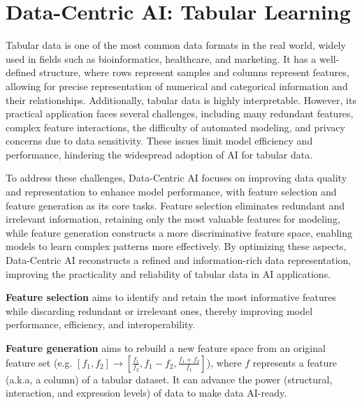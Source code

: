\vspace{-0.2cm}
\section{Data-Centric AI: Tabular Learning}

Tabular data is one of the most common data formats in the real world, widely used in fields such as bioinformatics, healthcare, and marketing. It has a well-defined structure, where rows represent samples and columns represent features, allowing for precise representation of numerical and categorical information and their relationships. Additionally, tabular data is highly interpretable. However, its practical application faces several challenges, including many redundant features, complex feature interactions, the difficulty of automated modeling, and privacy concerns due to data sensitivity. These issues limit model efficiency and performance, hindering the widespread adoption of AI for tabular data.

To address these challenges, Data-Centric AI focuses on improving data quality and representation to enhance model performance, with feature selection and feature generation as its core tasks. Feature selection eliminates redundant and irrelevant information, retaining only the most valuable features for modeling, while feature generation constructs a more discriminative feature space, enabling models to learn complex patterns more effectively. By optimizing these aspects, Data-Centric AI reconstructs a refined and information-rich data representation, improving the practicality and reliability of tabular data in AI applications.

\textbf{Feature selection}  aims to identify and retain the most informative features while discarding redundant or irrelevant ones, thereby improving model performance, efficiency, and interoperability.

\textbf{Feature generation} aims to rebuild a new feature space from an original feature set (e.g. $[f_1, f_2] \rightarrow [\frac{f_1}{f_2}, f_1-f_2, \frac{f_1+f_2}{f_1}]$), where $f$ represents a feature (a.k.a, a column) of a tabular dataset. It can advance the power (structural, interaction, and expression levels) of data to make data AI-ready.


